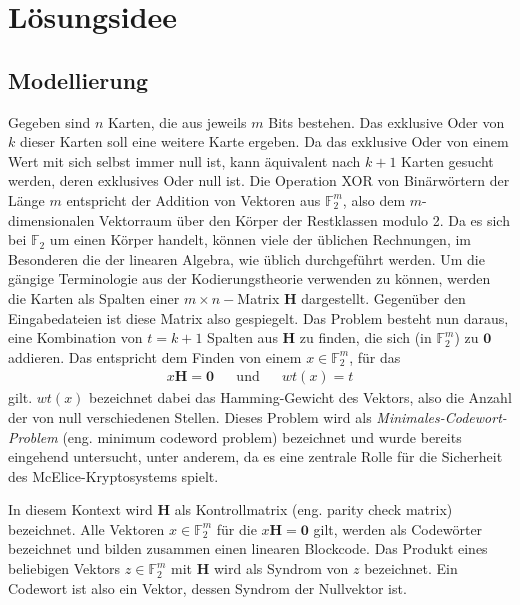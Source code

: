 \documentclass[a4paper,10pt,ngerman]{scrartcl}
\begin{document}
\maketitle
\tableofcontents

\section{Lösungsidee}
\subsection{Modellierung}
Gegeben sind $n$ Karten, die aus jeweils $m$ Bits bestehen. Das exklusive Oder von $k$ dieser Karten soll eine weitere Karte ergeben.
Da das exklusive Oder von einem Wert mit sich selbst immer null ist, kann äquivalent nach $k + 1$ Karten gesucht werden, deren exklusives Oder null ist.
Die Operation XOR von Binärwörtern der Länge $m$ entspricht der Addition von Vektoren aus $\mathbb{F}_2^m$, also dem $m$-dimensionalen Vektorraum über den Körper der Restklassen modulo 2. 
Da es sich bei $\mathbb{F}_2$ um einen Körper handelt, können viele der üblichen Rechnungen, im Besonderen die der linearen Algebra, wie üblich durchgeführt werden. 
Um die gängige Terminologie aus der Kodierungstheorie verwenden zu können, werden die Karten als Spalten einer $m\times n-$Matrix $\mathbf{H}$ dargestellt. Gegenüber den Eingabedateien ist diese Matrix also gespiegelt. 
Das Problem besteht nun daraus, eine Kombination von $t = k + 1$ Spalten aus $\mathbf{H}$ zu finden, die sich (in $\mathbb{F}_2^m$) zu $\mathbf{0}$ addieren. Das entspricht dem Finden von einem $x \in \mathbb{F}^m_2$, für das 
\begin{align*}
    x \mathbf{H} = \mathbf{0} && \text{und} && wt(x) = t
\end{align*}
gilt. $wt(x)$ bezeichnet dabei das Hamming-Gewicht des Vektors, also die Anzahl der von null verschiedenen Stellen. 
Dieses Problem wird als \textit{Minimales-Codewort-Problem} (eng. minimum codeword problem) bezeichnet und wurde bereits eingehend untersucht, unter anderem, da es eine zentrale Rolle für die Sicherheit des McElice-Kryptosystems spielt. 

In diesem Kontext wird $\mathbf{H}$ als Kontrollmatrix (eng. parity check matrix) bezeichnet.
Alle Vektoren $x \in \mathbb{F}^m_2$ für die $x \mathbf{H} = \mathbf{0}$ gilt,  werden als Codewörter bezeichnet und bilden zusammen einen linearen Blockcode. Das Produkt eines beliebigen Vektors $z \in \mathbb{F}^m_2$ mit $\mathbf{H}$ wird als Syndrom von $z$ bezeichnet. Ein Codewort ist also ein Vektor, dessen Syndrom der Nullvektor ist. 
\end{document}
